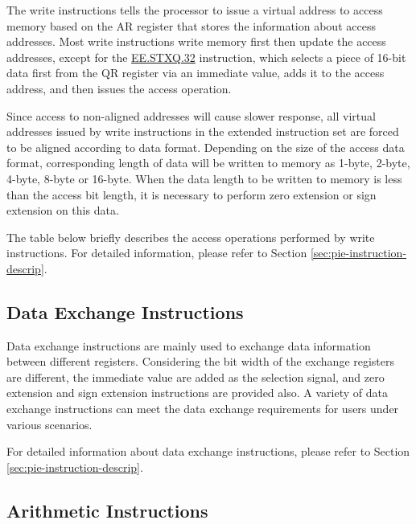 \documentclass[main\_\_EN.tex]{subfiles}
\begin{document}
The write instructions tells the processor to issue a virtual address to access memory based on the AR register that stores the information about access addresses. Most write instructions write memory first then update the access addresses, except for the \hyperref[instruction:EESTXQ32]{EE.STXQ.32} instruction, which selects a piece of 16-bit data first from the QR register via an immediate value, adds it to the access address, and then issues the access operation.

Since access to non-aligned addresses will cause slower response, all virtual addresses issued by write instructions in the extended instruction set are forced to be aligned according to data format. Depending on the size of the access data format, corresponding length of data will be written to memory as 1-byte, 2-byte, 4-byte, 8-byte or 16-byte. When the data length to be written to memory is less than the access bit length, it is necessary to perform zero extension or sign extension on this data.

The table below briefly describes the access operations performed by write instructions. For detailed information, please refer to Section \ref{sec:pie-instruction-descrip}.



\subsection{Data Exchange Instructions}
\label{sec:pie-data-exchange-instrucitons}

Data exchange instructions are mainly used to exchange data information between different registers. Considering the bit width of the exchange registers are different, the immediate value are added as the selection signal, and zero extension and sign extension instructions are provided also. A variety of data exchange instructions can meet the data exchange requirements for users under various scenarios.

For detailed information about data exchange instructions, please refer to Section \ref{sec:pie-instruction-descrip}.



\subsection{Arithmetic Instructions}
\label{sec:pie-arithmetic-instrucitons}
\end{document}
